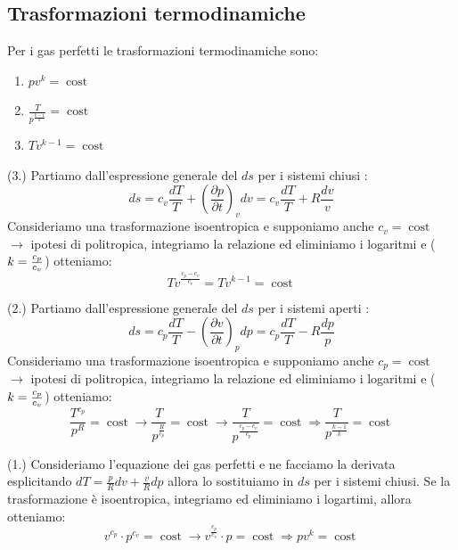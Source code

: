 \documentclass[a4paper]{article}
\numberwithin{equation}{section}%
\begin{document}
\subsection{Trasformazioni termodinamiche}

Per i gas perfetti le trasformazioni termodinamiche sono:
\begin{enumerate}
	\item $p v^{k}=\operatorname{cost}$
	\item $\frac{T}{p^{\frac{k-1}{k}}}=\operatorname{cost}$
	\item $T v^{k-1}=\operatorname{cost}$
\end{enumerate}


(3.)
\newline
Partiamo dall'espressione generale del $ds$ per i sistemi chiusi :
\begin{equation}
d s=c_{v} \frac{d T}{T}+\left(\frac{\partial p}{\partial t}\right)_{v} d v=c_{v} \frac{d T}{T}+R \frac{d v}{v}
\end{equation}
Consideriamo una trasformazione isoentropica e supponiamo anche $c_v=\operatorname{cost}$ $\longrightarrow$ ipotesi di politropica, integriamo la relazione ed eliminiamo i logaritmi e ($k={c_p\over c_v}$) otteniamo:
\begin{equation}
T v^{\frac{c_{p}-c_{v}}{c_{v}}}=T v^{k-1}=\operatorname{cost}
\end{equation}
 \newline
 
 (2.)
 \newline 
Partiamo dall'espressione generale del $ds$ per i sistemi aperti :
 \begin{equation}
d s=c_{p} \frac{d T}{T}-\left(\frac{\partial v}{\partial t}\right)_{p} d p=c_{p} \frac{d T}{T}-R \frac{d p}{p}
 \end{equation}
 Consideriamo una trasformazione isoentropica e supponiamo anche $c_p=\operatorname{cost}$ $\longrightarrow$ ipotesi di politropica, integriamo la relazione ed eliminiamo i logaritmi e ($k={c_p\over c_v}$) otteniamo:
\begin{equation}
\frac{T^{c_{p}}}{p^{R}}=\operatorname{cost} \rightarrow \frac{T}{p^{\frac{R}{c_{p}}}}=\operatorname{cost} \rightarrow \frac{T}{p^{\frac{c_{p}-c_{v}}{c_{p}}}}=\operatorname{cost} \Rightarrow \frac{T}{p^{\frac{k-1}{k}}}=\operatorname{cost}
\end{equation}
\newline

(1.)
\newline
Consideriamo l'equazione dei gas perfetti e ne facciamo la derivata esplicitando $d T=\frac{p}{R} d v+\frac{v}{R} d p$ allora lo sostituiamo in $ds$  per i sistemi chiusi. Se la trasformazione è isoentropica, integriamo ed eliminiamo i logartimi, allora otteniamo:
\begin{equation}
v^{c_{p}} \cdot p^{c_{v}}=\operatorname{cost}\longrightarrow v^{\frac{c_{p}}{c_{v}}} \cdot p=\operatorname{cost} \Rightarrow p v^{k}=\operatorname{cost}
\end{equation}
\end{document}
